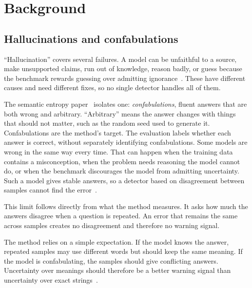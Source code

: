 \chapter{Background}
\label{ch:background}

\section{Hallucinations and confabulations}
\label{sec:hallucination-confabulation}

``Hallucination'' covers several failures. A model can be unfaithful to a
source, make unsupported claims, run out of knowledge, reason badly, or guess
because the benchmark rewards guessing over admitting
ignorance~\cite{ji_hallucination_survey_2023,%
huang_llm_hallucination_survey_2023,%
maynez_faithfulness_factuality_2020,%
kalai_why_language_models_hallucinate_2025,%
augenstein_factuality_challenges_2024}. These have different causes and need
different fixes, so no single detector handles all of them.

The semantic entropy paper~\cite{semantic_entropy_nature_2024} isolates one:
\emph{confabulations}, fluent answers that are both wrong and arbitrary.
``Arbitrary'' means the answer changes with things that should not matter, such
as the random seed used to generate it. Confabulations are the method's target.
The evaluation labels whether each answer is correct, without separately
identifying confabulations. Some models are wrong in the same way every time.
That can happen when the training data contains a misconception, when the
problem needs reasoning the model cannot do, or when the benchmark discourages
the model from admitting uncertainty. Such a model gives stable answers, so a
detector based on disagreement between samples cannot find the
error~\cite{simhi_choke_2025,ma_semantic_energy_2025}.

This limit follows directly from what the method measures. It asks how much the
answers disagree when a question is repeated. An error that remains the same
across samples creates no disagreement and therefore no warning signal.

The method relies on a simple expectation. If the model knows the answer,
repeated samples may use different words but should keep the same meaning. If
the model is confabulating, the samples should give conflicting answers.
Uncertainty over meanings should therefore be a better warning signal than
uncertainty over exact strings~\cite{kuhn_semantic_uncertainty_2023,semantic_entropy_nature_2024}.

